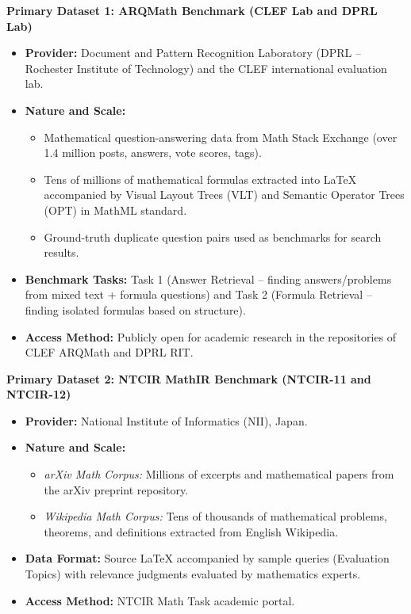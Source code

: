 \documentclass[11pt,a4paper]{article}
\begin{document}
\noindent\textbf{Primary Dataset 1: ARQMath Benchmark (CLEF Lab and DPRL Lab)}
\begin{itemize}[leftmargin=1.5em]
    \item \textbf{Provider:} Document and Pattern Recognition Laboratory (DPRL -- Rochester Institute of Technology) and the CLEF international evaluation lab.
    \item \textbf{Nature and Scale:}
    \begin{itemize}[leftmargin=1.2em]
        \item Mathematical question-answering data from Math Stack Exchange (over 1.4 million posts, answers, vote scores, tags).
        \item Tens of millions of mathematical formulas extracted into \LaTeX{} accompanied by Visual Layout Trees (VLT) and Semantic Operator Trees (OPT) in MathML standard.
        \item Ground-truth duplicate question pairs used as benchmarks for search results.
    \end{itemize}
    \item \textbf{Benchmark Tasks:} Task 1 (Answer Retrieval -- finding answers/problems from mixed text + formula questions) and Task 2 (Formula Retrieval -- finding isolated formulas based on structure).
    \item \textbf{Access Method:} Publicly open for academic research in the repositories of CLEF ARQMath and DPRL RIT.
\end{itemize}

\vspace{0.8em}
\noindent\textbf{Primary Dataset 2: NTCIR MathIR Benchmark (NTCIR-11 and NTCIR-12)}
\begin{itemize}[leftmargin=1.5em]
    \item \textbf{Provider:} National Institute of Informatics (NII), Japan.
    \item \textbf{Nature and Scale:}
    \begin{itemize}[leftmargin=1.2em]
        \item \textit{arXiv Math Corpus:} Millions of excerpts and mathematical papers from the arXiv preprint repository.
        \item \textit{Wikipedia Math Corpus:} Tens of thousands of mathematical problems, theorems, and definitions extracted from English Wikipedia.
    \end{itemize}
    \item \textbf{Data Format:} Source \LaTeX{} accompanied by sample queries (Evaluation Topics) with relevance judgments evaluated by mathematics experts.
    \item \textbf{Access Method:} NTCIR Math Task academic portal.
\end{itemize}
\end{document}
